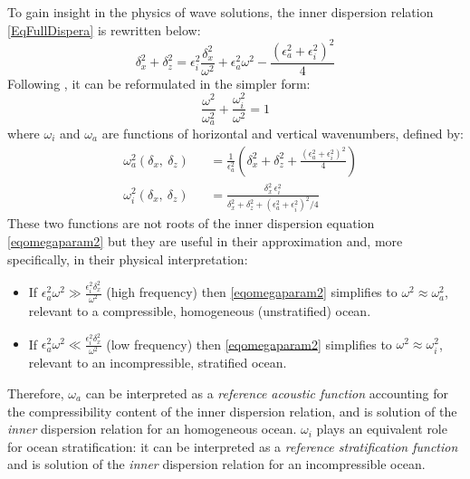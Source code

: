 \documentclass[a4paper,11pt]{article}
\begin{document}

To gain insight in the physics of wave solutions, the inner dispersion relation \ref{EqFullDispera} is rewritten below:
%
\begin{equation}
\delta_x^2+\delta_z^2 =\epsilon_i^2\frac{\delta_x^2}
{\omega^2}+\epsilon_a^2\omega^2-\frac{(\epsilon_a^2+\epsilon_i^2)^2}{4}
	\label{eqomegaparam2}
\end{equation}
%
Following \cite{RevModPhys.35.207}, it can be reformulated in the simpler form:
\begin{equation}
	\frac{\omega^2}{\omega_a^2}+\frac{\omega_i^2}{\omega^2}=1
	\label{eqlink}
\end{equation}
%
where $\omega_i$ and $\omega_a$ are functions of horizontal and vertical wavenumbers, defined by:
%
\begin{subequations}
	\label{EqDispSols}
	\begin{alignat}{2}	
	\label{SolAcous}
	& \omega_a^2(\delta_x,\ \delta_z) &&=\frac{1}{\epsilon_a^2}\left(
	\delta_x^2+\delta_z^2
	+\frac{(\epsilon_a^2+\epsilon_i^2)^2}{4}
	\right)\\
	\label{SolGrav}
	&\omega_i^2(\delta_x,\ \delta_z)  &&=
	\frac{\delta_x^2\ \epsilon_i^2}{\delta_x^2+\delta_z^2
	+(\epsilon_a^2+\epsilon_i^2)^2/4}
	\end{alignat}
\end{subequations}
%
These two functions are not roots of the inner dispersion equation \ref{eqomegaparam2} but they are useful in their approximation and, more specifically, in their physical interpretation:
%
\begin{itemize}
	\item If
	$\epsilon_a^2\omega^2 \gg \frac{\epsilon_i^2\delta_x^2}{\omega^2}$ (high frequency) then \ref{eqomegaparam2} simplifies to $\omega^2\approx\omega_a^2$, relevant to a compressible, homogeneous (unstratified) ocean.
	\item If $\epsilon_a^2\omega^2 \ll \frac{\epsilon_i^2\delta_x^2}{\omega^2}$ (low frequency) then \ref{eqomegaparam2} simplifies to $\omega^2\approx\omega_i^2$, relevant to an incompressible, stratified ocean.
\end{itemize}
%
Therefore, $\omega_a$ can be interpreted as a  \textit{reference acoustic function} accounting for the compressibility content of the inner dispersion relation, and is solution of the \textit{inner} dispersion relation for an homogeneous ocean. $\omega_i$ plays an equivalent role for ocean stratification: it can be interpreted as a  \textit{reference stratification function} and is solution of the \textit{inner} dispersion relation for an incompressible ocean.\\
\end{document}
